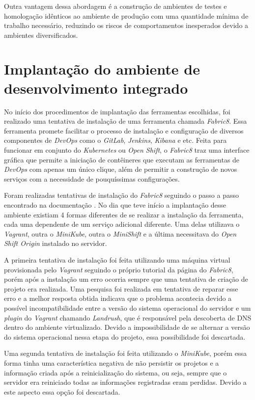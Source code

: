 \documentclass[
12pt,				%
openright,			%
oneside,			%
a4paper,			%
english,			%
french,				%
spanish,			%
brazil,				%
]{abntex2}
\begin{document}
Outra vantagem dessa abordagem é a construção de ambientes de testes e homologação idênticos ao ambiente de produção com uma quantidade mínima de trabalho necessário, reduzindo os riscos de comportamentos inesperados devido a ambientes diversificados.

\section{Implantação do ambiente de desenvolvimento integrado}

No início dos procedimentos de implantação das ferramentas escolhidas, foi realizado uma tentativa de instalação de uma ferramenta chamada \textit{Fabric8}. Essa ferramenta promete facilitar o processo de instalação e configuração de diversos componentes de \textit{DevOps} como o \textit{GitLab}, \textit{Jenkins}, \textit{Kibana} e etc. Feita para funcionar em conjunto do \textit{Kubernetes} ou \textit{Open Shift}, o \textit{Fabric8} traz uma interface gráfica que permite a iniciação de contêineres que executam as ferramentas de \textit{DevOps} com apenas um único clique, além de permitir a construção de novos serviços com a necessidade de pouquíssimas configurações.

Foram realizadas tentativas de instalação do \textit{Fabric8} seguindo o passo a passo encontrado na documentação \cite{Fabric8:Docs}. No dia que teve início a implantação desse ambiente existiam 4 formas diferentes de se realizar a instalação da ferramenta, cada uma dependente de um serviço adicional diferente. Uma delas utilizava o \textit{Vagrant}, outra o \textit{MiniKube}, outra o \textit{MiniShift} e a última necessitava do \textit{Open Shift Origin} instalado no servidor.

A primeira tentativa de instalação foi feita utilizando uma máquina virtual provisionada pelo \textit{Vagrant} seguindo o próprio tutorial da página do \textit{Fabric8}, porém após a instalação um erro ocorria sempre que uma tentativa de criação de projeto era realizada. Uma pesquisa foi realizada em tentativa de reparar esse erro e a melhor resposta obtida indicava que o problema acontecia devido a possível incompatibilidade entre a versão do sistema operacional do servidor e um \textit{plugin} do \textit{Vagrant} chamando \textit{Landrush}, que é responsável pela descoberta de DNS dentro do ambiente virtualizado. Devido a impossibilidade de se alternar a versão do sistema operacional nessa etapa do projeto, essa possibilidade foi descartada.

Uma segunda tentativa de instalação foi feita utilizando o \textit{MiniKube}, porém essa forma tinha uma característica negativa de não persistir os projetos e a informação criada após a reinicialização do sistema, ou seja, sempre que o servidor era reiniciado todas as informações registradas eram perdidas. Devido a este aspecto essa opção foi descartada.
\end{document}
